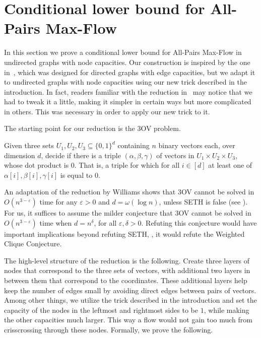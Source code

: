 \documentclass{toc}
\theoremstyle{plain}
\newcommand{\ProblemName}[1]{\textsf{#1}}
\newcommand{\SETH}{SETH\xspace}
\newcommand{\APMF}{\ProblemName{All-Pairs Max-Flow}\xspace}
\newcommand{\TOV}{\ProblemName{$3$OV}\xspace}
\newcommand\eps{\varepsilon}
\begin{document}
\section{Conditional lower bound for \APMF}\label{sec:lower}

In this section we prove a conditional lower bound for \APMF
in undirected graphs with node capacities.
Our construction is inspired by the one in~\cite{KT18}, which was designed for directed graphs with edge capacities, but we
%
adapt it to undirected graphs with node capacities %
%
using our new trick described in the introduction.
In fact, readers familiar with the reduction in~\cite{KT18} may notice that we had to tweak it a little, making it simpler in certain ways but more complicated in others.  This was necessary in order to apply our new trick
%
%
to it.

The starting point for our reduction is the \TOV problem.
\begin{definition}[\TOV]
Given three sets $U_1, U_2, U_3 \subseteq \{0,1\}^d$ containing $n$ binary vectors each, over dimension $d$, decide if there is a triple $(\alpha,\beta,\gamma)$ of vectors in $U_1 \times U_2 \times U_3$, whose dot product is $0$. That is, a triple for which for all $i \in [d]$ at least one of $\alpha[i],\beta[i],\gamma[i]$ is equal to $0$.
\end{definition}

An adaptation of the reduction by Williams \cite{Wil05} shows that  \TOV cannot be solved in $O(n^{3-\eps})$ time for any $\eps>0$ and $d=\omega(\log{n})$, unless \SETH is false (see \cite{ABV15}).
For us, it suffices to assume the milder conjecture that \TOV cannot be solved in  $O(n^{3-\eps})$ time when $d=n^{\delta}$, for all $\eps,\delta>0$.
Refuting this conjecture
%
would have    %
important implications beyond refuting \SETH \cite{GIKW17,ABDN18}, \eg, it
%
would refute  %
the Weighted Clique Conjecture.

The %
high-level   %
structure of the reduction is the
%
%
following.  Create  %
three layers of nodes that correspond to the three sets of vectors, with additional two layers in between them that correspond to the coordinates. These additional layers help keep the number of edges small by avoiding direct edges between pairs of vectors.
Among other things, we utilize the trick described in the introduction and set the capacity of the nodes in the leftmost and rightmost sides to be $1$, while making the other capacities much larger. This way a flow would not gain too much from crisscrossing through these nodes. Formally, we prove the following.
\end{document}
